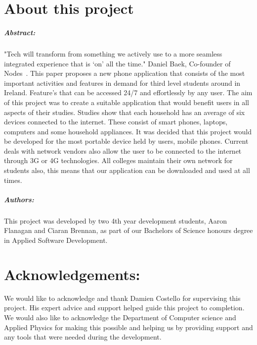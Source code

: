 
\chapter*{About this project}
\paragraph{Abstract:}
"Tech will transform from something we actively use to a more seamless integrated experience that is ‘on’ all the time." Daniel Baek, Co-founder of Nodes~\cite{nodes}. This paper proposes a new phone application that consists of the most important activities and features in demand for third level students around in Ireland. Feature's that can be accessed 24/7 and effortlessly by any user. The aim of this project was to create a suitable application that would benefit users in all aspects of their studies. Studies show that each household has an average of six devices connected to the internet. These consist of smart phones, laptops, computers and some household appliances. It was decided that this project would be developed for the most portable device held by users, mobile phones. Current deals with network vendors also allow the user to be connected to the internet through 3G or 4G technologies. All colleges maintain their own network for students also, this means that our application can be downloaded and used at all times.

\paragraph{Authors:}
This project was developed by two 4th year development students, Aaron Flanagan and Ciaran Brennan, as part of our Bachelors of Science honours degree in Applied Software Development.

\chapter*{Acknowledgements:}
We would like to acknowledge and thank Damien Costello for supervising this project. His expert advice and support helped guide this project to completion. We would also like to acknowledge the Department of Computer science and Applied Physics for making this possible and helping us by providing support and any tools that were needed during the development.

